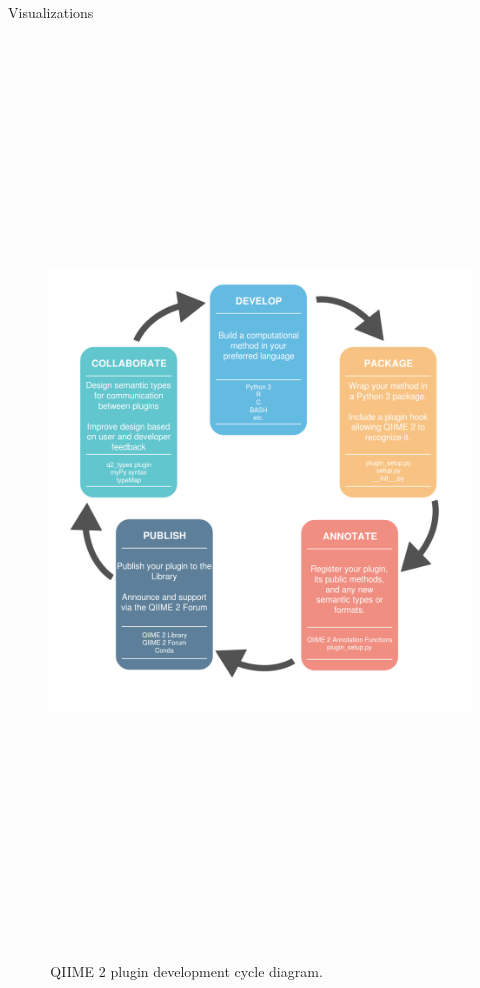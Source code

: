 \documentclass[final]{beamer}
\newlength{\colwidth}
\begin{document}
\begin{frame}[t]
\begin{columns}[t]
\begin{column}{\colwidth}
  \begin{block}{Visualizations}
    \begin{figure}[tph!]
    {\includegraphics[height=24cm]{assets/DevelopmentProcessDiagramGreyWBG}}
    \caption{\,QIIME 2 plugin development cycle diagram. }
    \label{fig:processDiagram}
    \end{figure}


\end{block}
\end{column}
\end{columns}
\end{frame}
\end{document}

